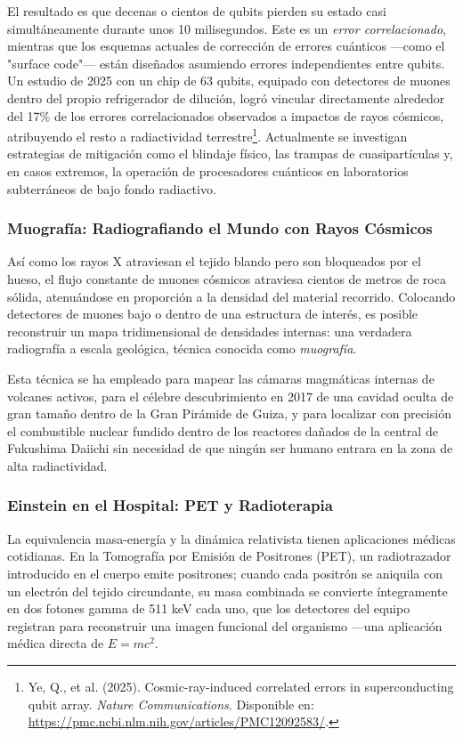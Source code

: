 \documentclass[11pt,a4paper]{book}
\begin{document}
El resultado es que decenas o cientos de qubits pierden su estado casi simultáneamente durante
unos 10 milisegundos. Este es un \emph{error correlacionado}, mientras que los esquemas actuales
de corrección de errores cuánticos —como el "surface code"— están diseñados asumiendo errores
independientes entre qubits. Un estudio de 2025 con un chip de 63 qubits, equipado con
detectores de muones dentro del propio refrigerador de dilución, logró vincular directamente
alrededor del 17\% de los errores correlacionados observados a impactos de rayos cósmicos, atribuyendo
el resto a radiactividad terrestre\footnote{Ye, Q., et al. (2025). Cosmic-ray-induced correlated errors in superconducting qubit array. \emph{Nature Communications}. Disponible en: \url{https://pmc.ncbi.nlm.nih.gov/articles/PMC12092583/}.}. Actualmente se investigan estrategias de mitigación como
el blindaje físico, las trampas de cuasipartículas y, en casos extremos, la operación de
procesadores cuánticos en laboratorios subterráneos de bajo fondo radiactivo.

\subsubsection{Muografía: Radiografiando el Mundo con Rayos Cósmicos}

Así como los rayos X atraviesan el tejido blando pero son bloqueados por el hueso, el flujo
constante de muones cósmicos atraviesa cientos de metros de roca sólida, atenuándose en
proporción a la densidad del material recorrido. Colocando detectores de muones bajo o dentro
de una estructura de interés, es posible reconstruir un mapa tridimensional de densidades
internas: una verdadera radiografía a escala geológica, técnica conocida como \emph{muografía}.

Esta técnica se ha empleado para mapear las cámaras magmáticas internas de volcanes activos,
para el célebre descubrimiento en 2017 de una cavidad oculta de gran tamaño dentro de la Gran
Pirámide de Guiza, y para localizar con precisión el combustible nuclear fundido dentro de los
reactores dañados de la central de Fukushima Daiichi sin necesidad de que ningún ser humano
entrara en la zona de alta radiactividad.

\subsubsection{Einstein en el Hospital: PET y Radioterapia}

La equivalencia masa-energía y la dinámica relativista tienen aplicaciones médicas cotidianas.
En la Tomografía por Emisión de Positrones (PET), un radiotrazador introducido en el cuerpo
emite positrones; cuando cada positrón se aniquila con un electrón del tejido circundante, su
masa combinada se convierte íntegramente en dos fotones gamma de 511 keV cada uno, que los
detectores del equipo registran para reconstruir una imagen funcional del organismo —una
aplicación médica directa de $E=mc^2$.
\end{document}
